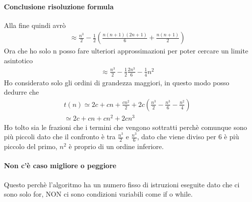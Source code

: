 \paragraph*{Conclusione risoluzione formula} Alla fine quindi avrò
\begin{align*}
    \approx \frac{n^3}{2}-\frac{1}{2}(\frac{n(n+1)(2n+1)}{6}+ 
    \frac{n(n+1)}{2})
\end{align*}
Ora che ho solo n posso fare ulteriori approssimazioni per poter cercare un limite asintotico
\begin{align*}
    \approx \frac{n^3}{2} -\frac{1}{2}\frac{2n^3}{6}-\frac{1}{4}n^2
\end{align*}
Ho considerato solo gli ordini di grandezza maggiori, in questo modo posso dedurre che 
\begin{align*}
    t(n)\simeq 2c+cn+\frac{cn^2}{2} + 2c(\frac{n^3}{2}-\frac{n^3}{6}-\frac{n^2}{4})\\
    \simeq 2c+cn+cn^2+2cn^3
\end{align*}
Ho tolto sia le frazioni che i termini che vengono sottratti perchè comunque sono più piccoli dato
che il confronto è tra $\frac{n^3}{2}$ e $\frac{n^3}{6}$, dato che viene diviso per 6 è più piccolo
del primo, $n^2$ è proprio di un ordine inferiore.\\
\paragraph*{Non c'è caso migliore o peggiore} Questo perchè l'algoritmo ha un numero fisso di
istruzioni eseguite dato che ci sono solo for, NON ci sono condizioni variabili come if o while.
